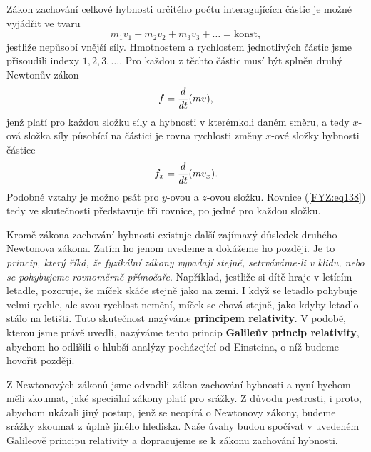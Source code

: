 {    Zákon zachování celkové hybnosti určitého počtu interagujících částic je možné vyjádřit ve tvaru
    \begin{equation}\label{FYZ:eq138}
      m_1v_1 + m_2v_2 + m_3v_3 + \ldots = \text{konst},
    \end{equation}
    jestliže nepůsobí vnější síly. Hmotnostem a rychlostem jednotlivých částic jsme přisoudili 
    indexy \(1, 2, 3, \ldots\). Pro každou z těchto částic musí být splněn druhý Newtonův zákon
    \begin{equation}\label{FYZ:eq139}
      f = \frac{d  }{d t}(mv),
    \end{equation}
    jenž platí pro každou složku síly a hybnosti v kterémkoli daném směru, a tedy \(x\)-ová složka 
    síly působící na částici je rovna rychlosti změny \(x\)-ové složky hybnosti částice
    \begin{equation}\label{FYZ:eq140}
      f_x = \frac{d  }{d t}(mv_x).
    \end{equation}
    Podobné vztahy je možno psát pro \(y\)-ovou a \(z\)-ovou složku. Rovnice (\ref{FYZ:eq138}) tedy 
    ve skutečnosti představuje tři rovnice, po jedné pro každou složku.
    
    Kromě zákona zachování hybnosti existuje další zajímavý důsledek druhého Newtonova zákona. 
    Zatím ho jenom uvedeme a dokážeme ho později. Je to \emph{princip, který říká, že fyzikální 
    zákony vypadají stejně, setrváváme-li v klidu, nebo se pohybujeme rovnoměrně přímočaře}. 
    Například, jestliže si dítě hraje v letícím letadle, pozoruje, že míček skáče stejně jako na 
    zemi. I když se letadlo pohybuje velmi rychle, ale svou rychlost nemění, míček se chová stejně, 
    jako kdyby letadlo stálo na letišti. Tuto skutečnost nazýváme \textbf{principem relativity}. V 
    podobě, kterou jsme právě uvedli, nazýváme tento princip \textbf{Galileův princip relativity}, 
    abychom ho odlišili o hlubší analýzy pocházející od Einsteina, o níž budeme hovořit později.
    
    Z Newtonových zákonů jsme odvodili zákon zachování hybnosti a nyní bychom měli zkoumat, jaké 
    speciální zákony platí pro srážky. Z důvodu pestrosti, i proto, abychom ukázali jiný postup, 
    jenž se neopírá o Newtonovy zákony, budeme srážky zkoumat z úplně jiného hlediska. Naše úvahy 
    budou spočívat v uvedeném Galileově principu relativity a dopracujeme se k zákonu zachování 
    hybnosti.
    
}
